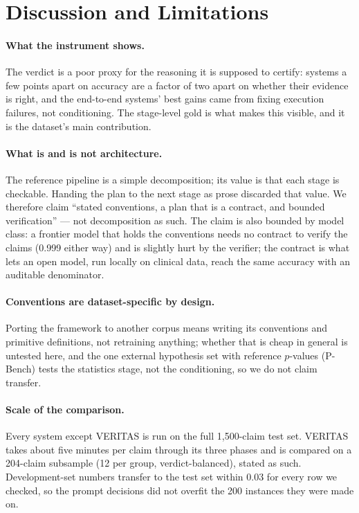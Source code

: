 \section{Discussion and Limitations}
\label{sec:limitations}

\paragraph{What the instrument shows.} The verdict is a poor proxy for the
reasoning it is supposed to certify: systems a few points apart on accuracy are
a factor of two apart on whether their evidence is right, and the end-to-end
systems' best gains came from fixing execution failures, not conditioning. The
stage-level gold is what makes this visible, and it is the dataset's main
contribution.

\paragraph{What is and is not architecture.} The reference pipeline is a
simple decomposition; its value is that each stage is checkable. Handing the
plan to the next stage as prose discarded that value. We therefore claim
``stated conventions, a plan that is a contract, and bounded verification''
--- not decomposition as such. The claim is also bounded by model class: a
frontier model that holds the conventions needs no contract to verify the
claims (0.999 either way) and is slightly hurt by the verifier; the contract
is what lets an open model, run locally on clinical data, reach the same
accuracy with an auditable denominator.

\paragraph{Conventions are dataset-specific by design.} Porting the framework
to another corpus means writing its conventions and primitive definitions, not
retraining anything; whether that is cheap in general is untested here, and the
one external hypothesis set with reference $p$-values (P-Bench) tests the
statistics stage, not the conditioning, so we do not claim transfer.

\paragraph{Scale of the comparison.} Every system except VERITAS is run on
the full 1{,}500-claim test set. VERITAS takes about five minutes per claim
through its three phases and is compared on a 204-claim subsample (12 per
group, verdict-balanced), stated as such. Development-set numbers transfer to
the test set within 0.03 for every row we checked, so the prompt decisions
did not overfit the 200 instances they were made on.

